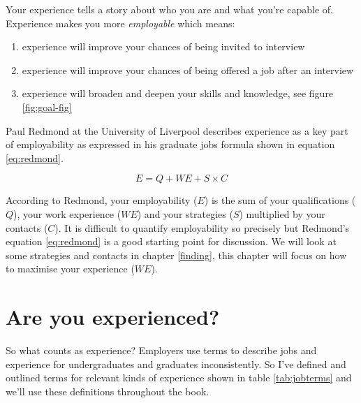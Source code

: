 \documentclass[
]{book}
\providecommand{\tightlist}{%
  \setlength{\itemsep}{0pt}\setlength{\parskip}{0pt}}
\begin{document}
Your experience tells a story about who you are and what you're capable of. Experience makes you more \emph{employable} which means:

\begin{enumerate}
\def\labelenumi{\arabic{enumi}.}
\tightlist
\item
  experience will improve your chances of being invited to interview
\item
  experience will improve your chances of being offered a job after an interview
\item
  experience will broaden and deepen your skills and knowledge, see figure \ref{fig:goal-fig}
\end{enumerate}

Paul Redmond at the University of Liverpool describes experience as a key part of employability \citep{paulredmond} as expressed in his graduate jobs formula shown in equation \eqref{eq:redmond}.

\begin{equation}
  E = Q + WE + S \times C
  \label{eq:redmond}
\end{equation}

According to Redmond, your employability (\(E\)) is the sum of your qualifications (\(Q\)), your work experience (\(WE\)) and your strategies (\(S\)) multiplied by your contacts (\(C\)). It is difficult to quantify employability so precisely but Redmond's equation \eqref{eq:redmond} is a good starting point for discussion. We will look at some strategies and contacts in chapter \ref{finding}, this chapter will focus on how to maximise your experience (\(WE\)).

\hypertarget{areuexperienced}{%
\section{Are you experienced?}\label{areuexperienced}}

So what counts as experience? Employers use terms to describe jobs and experience for undergraduates and graduates inconsistently. So I've defined and outlined terms for relevant kinds of experience shown in table \ref{tab:jobterms} and we'll use these definitions throughout the book.
\end{document}
